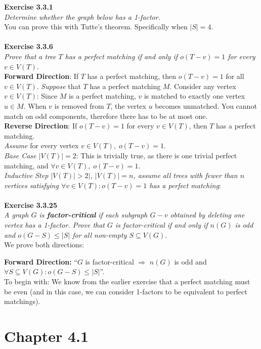 \noindent
\textbf{Exercise 3.3.1}\\
\noindent
\textit{Determine whether the graph below has a 1-factor.}\\
You can prove this with Tutte's theorem. Specifically when $|S| =4$.
\\\\
\noindent
\textbf{Exercise 3.3.6}\\
\noindent
\textit{Prove that a tree $T$ has a perfect matching if and only if $o(T-v)=1$ for every $v \in V(T)$.}\\
\noindent
\textbf{Forward Direction}: If $T$ has a perfect matching, then $o(T-v) = 1$ for all $v \in V(T)$.
\textit{Suppose} that $T$ has a perfect matching $M$. Consider any vertex $v \in V(T)$: Since $M$ is a perfect matching, $v$ is matched to exactly one vertex $u \in M$. When $v$ is removed from $T$, the vertex $u$ becomes unmatched.
You cannot match on odd components, therefore there has to be at most one.\\
\noindent
\textbf{Reverse Direction}: If $o(T-v) = 1$ for every $v \in V(T)$, then $T$ has a perfect matching.\\
\textit{Assume} for every vertex $v \in V(T), \; o(T-v)=1$.\\
\textit{Base Case $|V(T)| = 2$}: This is trivially true, as there is one trivial perfect matching, and $\forall v \in V(T), \; o(T-v) =1$.\\
\textit{Inductive Step $|V(T)| > 2|$, $|V(T)| = n$, assume all trees with fewer than $n$ vertices satisfying $\forall v \in V(T) : o(T-v)=1$ has a perfect matching}:
\\\\
\noindent
\textbf{Exercise 3.3.25}\\
\noindent
\textit{A graph $G$ is \textbf{factor-critical} if each subgraph $G-v$ obtained by deleting one vertex has a 1-factor. Prove that $G$ is factor-critical if and only if $n(G)$ is odd and $o(G-S) \le |S|$ for all non-empty $S \subseteq V(G)$.}\\
We prove both directions:

\textbf{Forward Direction:} ``$G$ is factor-critical \(\Rightarrow\) $n(G)$ is odd and $\forall S \subseteq V(G) : o(G-S) \le |S|$''. \\
To begin with: We know from the earlier exercise that a perfect matching must be even (and in this case, we can consider 1-factors to be equivalent to perfect matchings).

\section{Chapter 4.1}%
\label{sec:4.1}

